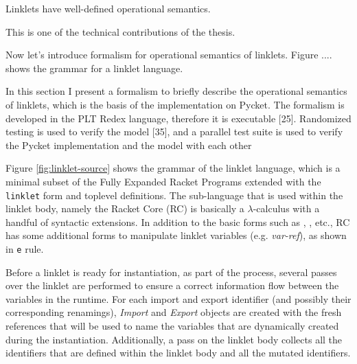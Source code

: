			\begin{mainpoint}
				Linklets have well-defined operational semantics.

				This is one of the technical contributions of the thesis.
			\end{mainpoint}

			\begin{paragraph-here}
				Now let's introduce formalism for operational semantics of linklets. Figure .... shows the grammar for a linklet language.

				In this section I present a formalism to briefly describe the operational semantics of linklets, which is the basis of the implementation on Pycket. The formalism is developed in the PLT Redex language, therefore it is executable [25]. Randomized testing is used to verify the model [35], and a parallel test suite is used to verify the Pycket implementation and the model with each other
			\end{paragraph-here}


			\begin{paragraph-here}
				Figure \ref{fig:linklet-source} shows the grammar of the linklet
				language, which is a minimal subset of the Fully Expanded Racket
				Programs extended with the \verb|linklet| form and toplevel
				definitions. The sub-language that is used within the linklet body,
				namely the Racket Core (RC) is basically a $\lambda$-calculus with a handful
				of syntactic extensions. In addition to the basic forms such
				as , ,  etc., RC has
				some additional forms to manipulate linklet variables
				(e.g. \emph{var-ref}), as shown in \verb|e| rule. %
			\end{paragraph-here}

			\begin{paragraph-here}
				Before a linklet is ready for instantiation, as part of the
				 process, several passes over the linklet are
				performed to ensure a correct information flow between the variables
				in the run\dash time. For each import and export identifier (and
				possibly their corresponding renamings), \emph{Import} and
				\emph{Export} objects are created with the fresh references that
				will be used to name the variables that are dynamically created during
				the instantiation. Additionally, a pass on the linklet body collects
				all the identifiers that are defined within the linklet body and all
				the mutated identifiers.
			\end{paragraph-here}



